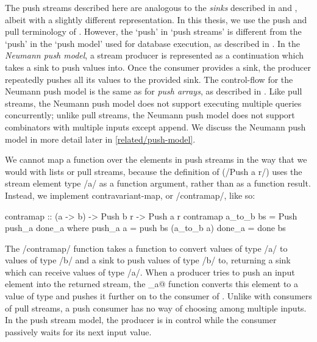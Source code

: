 The push streams described here are analogous to the \emph{sinks} described in \citet{bernardy2015duality} and \citet{lippmeier2016polarized}, albeit with a slightly different representation.
In this thesis, we use the push and pull terminology of \citet{kay2009you}.
However, the `push' in `push streams' is different from the `push' in the `push model' used for database execution, as described in \citet{neumann2011efficiently}.
In the \emph{Neumann push model}, a stream producer is represented as a continuation which takes a sink to push values into.
Once the consumer provides a sink, the producer repeatedly pushes all its values to the provided sink.
The control-flow for the Neumann push model is the same as for \emph{push arrays}, as described in \citet{claessen2012expressive}.
Like pull streams, the Neumann push model does not support executing multiple queries concurrently; unlike pull streams, the Neumann push model does not support combinators with multiple inputs except append.
We discuss the Neumann push model in more detail later in \cref{related/push-model}.


We cannot map a function over the elements in push streams in the way that we would with lists or pull streams, because the definition of (\Hs/Push a r/) uses the stream element type \Hs/a/ as a function argument, rather than as a function result.
Instead, we implement contravariant-map, or \Hs/contramap/, like so:

\begin{haskell}
contramap :: (a -> b) -> Push b r -> Push a r
contramap a_to_b bs = Push push_a done_a
 where
  push_a a = push bs (a_to_b a)
  done_a   = done bs
\end{haskell}

The \Hs/contramap/ function takes a function to convert values of type \Hs/a/ to values of type \Hs/b/ and a sink to push values of type \Hs/b/ to, returning a sink which can receive values of type \Hs/a/.
When a producer tries to push an input element into the returned stream, the \Hs@push_a@ function converts this element to a value of type \Hs@b@ and pushes it further on to the consumer of \Hs@b@.
Unlike with consumers of pull streams, a push consumer has no way of choosing among multiple inputs.
In the push stream model, the producer is in control while the consumer passively waits for its next input value.

